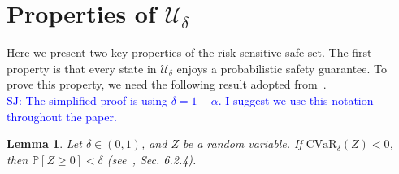 \documentclass[letterpaper, 10 pt, conference]{ieeeconf}  %
\newtheorem{lemma}{Lemma}
\begin{document}
\section{Properties of $\mathcal{U}_\delta$}
Here we present two key properties of the risk-sensitive safe set.
The first property is that every state in $\mathcal{U}_\delta$ enjoys a probabilistic safety guarantee.
To prove this property, we need the following result adopted from~\cite{shapiro2009lectures}.\\
\textcolor{blue}{SJ: The simplified proof is using $\delta = 1 - \alpha$. I suggest we use this notation throughout the paper. }\\
\begin{lemma}\label{lemma1}
 Let $\delta \in (0,1)$, and $Z$ be a random variable. If $\text{CVaR}_\delta(Z) < 0$, then $\mathbb{P}[Z\geq 0] < \delta$ (see~\cite{shapiro2009lectures}, Sec. 6.2.4).\footnotemark
\end{lemma}
\end{document}
